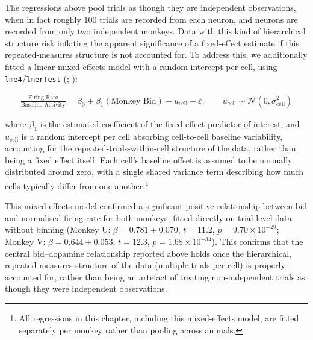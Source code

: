The regressions above pool trials as though they are independent observations, when in fact roughly 100 trials are recorded from each neuron, and neurons are recorded from only two independent monkeys. Data with this kind of hierarchical structure risk inflating the apparent significance of a fixed-effect estimate if this repeated-measures structure is not accounted for. To address this, we additionally fitted a linear mixed-effects model with a random intercept per cell, using \texttt{lme4}/\texttt{lmerTest} (\cite{bates2015fitting}; \cite{kuznetsova2017lmertest}):

\begin{align}
\frac{\text{Firing Rate}}{\text{Baseline Activity}} = \beta_0 + \beta_1(\text{Monkey Bid}) + u_{\text{cell}} + \varepsilon, \qquad u_{\text{cell}} \sim \mathcal{N}(0, \sigma^2_{\text{cell}}) \label{eq:lme_general}
\end{align}

where $\beta_1$ is the estimated coefficient of the fixed-effect predictor of interest, and $u_{\text{cell}}$ is a random intercept per cell absorbing cell-to-cell baseline variability, accounting for the repeated-trials-within-cell structure of the data, rather than being a fixed effect itself. Each cell's baseline offset is assumed to be normally distributed around zero, with a single shared variance term describing how much cells typically differ from one another.\footnote{All regressions in this chapter, including this mixed-effects model, are fitted separately per monkey rather than pooling across animals.}

This mixed-effects model confirmed a significant positive relationship between bid and normalised firing rate for both monkeys, fitted directly on trial-level data without binning (Monkey U: $\beta = 0.781 \pm 0.070$, $t = 11.2$, $p = 9.70 \times 10^{-29}$; Monkey V: $\beta = 0.644 \pm 0.053$, $t = 12.3$, $p = 1.68 \times 10^{-34}$). This confirms that the central bid--dopamine relationship reported above holds once the hierarchical, repeated-measures structure of the data (multiple trials per cell) is properly accounted for, rather than being an artefact of treating non-independent trials as though they were independent observations.

